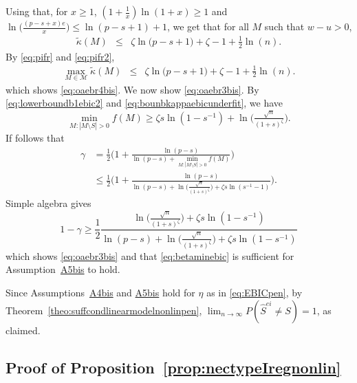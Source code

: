 \documentclass[
  12pt]{article}
\newcommand{\M}{\mathcal{M}}
\begin{document}
Using that, for $x\geq 1$, $(1+\frac{1}{x})\ln(1+x)\geq 1$ and $\ln\Big(\frac{(p-s+x)e}{x}\Big)\leq \ln(p-s+1)+1$, we get that for all $M$ such that $w-u>0$,
\begin{eqnarray}\label{eq:pifr2}
     \tilde{\kappa}(M) &\leq& \zeta\ln\big(p-s+1\big)+\zeta-1+\frac{1}{2}\ln(n).
 \end{eqnarray}
By \eqref{eq:pifr} and \eqref{eq:pifr2},
 \begin{eqnarray*}
     \max_{M\in\M}\tilde{\kappa}(M)  &\leq& \zeta\ln\big(p-s+1\big)+\zeta-1+\frac{1}{2}\ln(n).
 \end{eqnarray*}
which shows \eqref{eq:oaebr4bis}. We now show \eqref{eq:oaebr3bis}. By \eqref{eq:lowerboundb1ebic2} and \eqref{eq:bounbkappaebicunderfit}, we have
$$\min_{M: |M\setminus S|>0}f(M) \geq \zeta s\ln(1-s^{-1})+ \ln \big(\tfrac{\sqrt{n}}{(1+s)^{\zeta}}\big).$$
If follows that
 \begin{align*}
 \gamma&=\frac12\Big(1+\frac{\ln(p-s)}{\ln(p-s)+\min_{M: |M\setminus S|>0}f(M)}\Big) \\&\leq \frac12\Big(1+\frac{\ln(p-s)}{\ln(p-s)+ \ln \big(\tfrac{\sqrt{n}}{(1+s)^{\zeta}}\big)+\zeta s\ln(s^{-1}-1)}\Big).
 \end{align*}
 Simple algebra gives
  \begin{equation*}
 1-\gamma\geq \frac12\frac{ \ln \big(\tfrac{\sqrt{n}}{(1+s)^{\zeta}}\big)+\zeta s\ln(1-s^{-1})}{\ln(p-s)+ \ln \big(\tfrac{\sqrt{n}}{(1+s)^{\zeta}}\big)+\zeta s\ln(1-s^{-1})}
 \end{equation*}
 which shows \eqref{eq:oaebr3bis} and that \eqref{eq:betaminebic} is sufficient for  Assumption~\hyperlink{lab:A5bis}{A5bis} to hold.
 
 Since Assumptions~\hyperlink{lab:A4bis}{A4bis} and \hyperlink{lab:A5bis}{A5bis} hold for $\eta$ as in \eqref{eq:EBICpen}, by Theorem~\ref{theo:suffcondlinearmodelnonlinpen}, $\lim_{n\to\infty}P(\hat{S}^{ei}\neq S)= 1$, as claimed.

\subsection{Proof of Proposition~\ref{prop:nectypeIregnonlin}}
\end{document}
